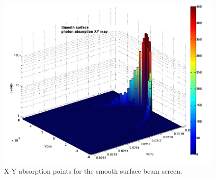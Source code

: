  \begin{figure}
 
  	\centering
   	\includegraphics[height=.45\textheight]{Graficas/nuevas/smoothxy.jpg}
  		\caption{\label{fig:xyplana}
   			X-Y absorption points for the smooth surface beam screen.}
\end{figure}



